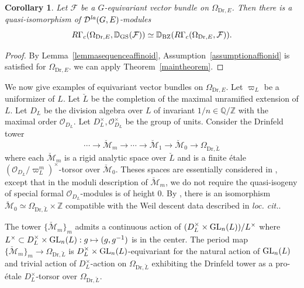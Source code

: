 \documentclass[a4paper,10pt]{amsart}
\theoremstyle{remark}
\theoremstyle{definition}
\theoremstyle{plain}
\newtheorem{corollary}[theorem]{Corollary}
\numberwithin{equation}{section}
\newcommand{\bbD}{{\mathbb D}}
\newcommand{\bbQ}{{\mathbb Q}}
\newcommand{\bbZ}{{\mathbb Z}}
\newcommand{\calD}{{\mathcal D}}
\newcommand{\calF}{{\mathcal F}}
\newcommand{\calM}{{\mathcal M}}
\newcommand{\calO}{{\mathcal O}}
\newcommand{\GL}{{\rm GL}}
\newcommand{\GS}{{\rm GS}}
\newcommand{\la}{{\it la}}
\newcommand{\BZ}{\ensuremath{\mathrm{BZ}}}
\begin{document}
\begin{corollary}\label{corBZdualDrinfeld}
	Let $\calF$ be a $G$-equivariant vector bundle on $\Omega_{\mathrm{Dr},E}$. Then there is a quasi-isomorphism of $\calD^{\la}(G,E)$-modules
	$$R\Gamma_c(\Omega_{\mathrm{Dr},E},\bbD_{\GS}(\calF))\simeq \bbD_{\BZ}(R\Gamma_c(\Omega_{\mathrm{Dr},E},\calF)).$$
\end{corollary}
\begin{proof}
	By Lemma~\ref{lemmasequenceaffinoid}, Assumption~\ref{assumptionaffionid} is satisfied for $\Omega_{\mathrm{Dr},E}$. we can apply Theorem~\ref{maintheorem}.
\end{proof}
We now give examples of equivariant vector bundles on $\Omega_{\mathrm{Dr},E}$. Let $\varpi_L$ be a uniformizer of $L$. Let $\breve{L}$ be the completion of the maximal unramified extension of $L$. Let $D_L$ be the division algebra over $L$ of invariant $1/n\in \bbQ/\bbZ$ with the maximal order $\calO_{D_L}$. Let $D_L^{\times},\calO_{D_L}^{\times}$ be the group of units. Consider the Drinfeld tower
\begin{equation}\label{equationDrinfeldtower}
	\cdots\to\breve{\calM}_m\rightarrow \cdots \rightarrow \breve{\calM}_1\rightarrow \breve{\calM}_0\rightarrow \Omega_{\mathrm{Dr},\breve{L}}
\end{equation}
where each $\breve{\calM}_m$ is a rigid analytic space over $\breve{L}$ and is a finite \'etale $(\calO_{D_L}/\varpi_L^m)^{\times}$-torsor over $\breve{\calM}_{0}$. Theses spaces are essentially considered in \cite[\S~3]{drinfeld1976coverings}, except that in the moduli description of $\breve{\calM}_m$, we do not require the quasi-isogeny of special formal $\calO_{D_L}$-modules is of height $0$. By \cite[Thm.~3.72]{rapoportZink1996}, there is an isomorphism $ \breve{\calM}_0\simeq \Omega_{\mathrm{Dr},\breve{L}}\times \bbZ$ compatible with the Weil descent data described in \textit{loc. cit.}.

The tower $\{\breve{\calM}_m\}_m$ admits a continuous action of $(D_L^{\times}\times \GL_n(L))/L^{\times}$ where $L^{\times}\subset D_L^{\times}\times \GL_n(L):g\mapsto (g,g^{-1})$ is in the center. The period map $\{\breve{\calM}_m\}_m \to \Omega_{\mathrm{Dr},\breve{L}}$ is $D_L^{\times}\times \GL_n(L)$-equivariant for the natural action of $\GL_n(L)$ and trivial action of $D_L^{\times}$-action on $\Omega_{\mathrm{Dr},\breve{L}}$ exhibiting the Drinfeld tower as a pro-\'etale $D_L^{\times}$-torsor over $\Omega_{\mathrm{Dr},\breve{L}}$.
\end{document}
